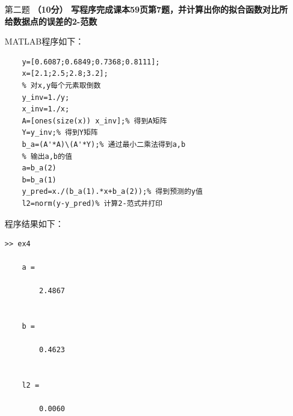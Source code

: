 \documentclass[12pt,a4paper,utf8]{ctexart}
\begin{document}
\begin{enumerate}
\newpage
\item[第二题]\textbf{（10分） 写程序完成课本59页第7题，并计算出你的拟合函数对比所给数据点的误差的2-范数}

MATLAB程序如下：
\begin{lstlisting}[frame=single]
    % 初始化x,y
    y=[0.6087;0.6849;0.7368;0.8111];
    x=[2.1;2.5;2.8;3.2];
    % 对x,y每个元素取倒数
    y_inv=1./y;
    x_inv=1./x;
    A=[ones(size(x)) x_inv];% 得到A矩阵
    Y=y_inv;% 得到Y矩阵
    b_a=(A'*A)\(A'*Y);% 通过最小二乘法得到a,b
    % 输出a,b的值
    a=b_a(2)
    b=b_a(1)
    y_pred=x./(b_a(1).*x+b_a(2));% 得到预测的y值
    l2=norm(y-y_pred)% 计算2-范式并打印
\end{lstlisting}

程序结果如下：
\begin{lstlisting}[frame=single]
    >> ex4

    a =
    
        2.4867
    
    
    b =
    
        0.4623
    
    
    l2 =
    
        0.0060
\end{lstlisting}







\end{enumerate}
\end{document}
